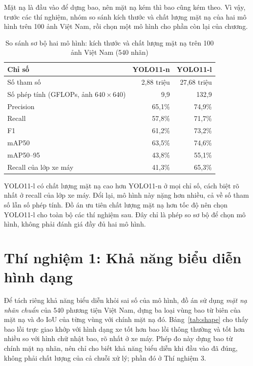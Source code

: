 Mặt nạ là đầu vào để dựng bao, nên mặt nạ kém thì bao cũng kém theo. Vì vậy, trước các thí nghiệm, nhóm so sánh kích thước và chất lượng mặt nạ của hai mô hình trên 100 ảnh Việt Nam, rồi chọn một mô hình cho phần còn lại của chương.

\begin{table}[H]
\centering
\caption{So sánh sơ bộ hai mô hình: kích thước và chất lượng mặt nạ trên 100 ảnh Việt Nam (540 nhãn)}
\label{tab:model_select}
\begin{tabular}{lrr}
\toprule
Chỉ số & YOLO11-n & YOLO11-l \\
\midrule
Số tham số & 2,88 triệu & 27,68 triệu \\
Số phép tính (GFLOPs, ảnh $640\times640$) & 9,9 & 132,9 \\
\midrule
Precision & 65,1\% & 74,9\% \\
Recall & 57,8\% & 71,7\% \\
F1 & 61,2\% & 73,2\% \\
mAP50 & 63,5\% & 74,6\% \\
mAP50--95 & 43,8\% & 55,1\% \\
Recall của lớp xe máy & 41,3\% & 65,3\% \\
\bottomrule
\end{tabular}
\end{table}

YOLO11-l có chất lượng mặt nạ cao hơn YOLO11-n ở mọi chỉ số, cách biệt rõ nhất ở recall của lớp xe máy. Đổi lại, mô hình này nặng hơn nhiều, cả về số tham số lẫn số phép tính.
Đồ án ưu tiên chất lượng mặt nạ hơn tốc độ nên chọn YOLO11-l cho toàn bộ các thí nghiệm sau. Đây chỉ là phép so sơ bộ để chọn mô hình, không phải đánh giá đầy đủ hai mô hình.

\section{Thí nghiệm 1: Khả năng biểu diễn hình dạng}
\label{sec:exp_shape}

Để tách riêng khả năng biểu diễn khỏi sai số của mô hình, đồ án sử dụng \emph{mặt nạ nhãn chuẩn} của 540 phương tiện Việt Nam,
dựng ba loại vùng bao từ biên của mặt nạ và đo IoU của từng vùng với chính mặt nạ đó.
Bảng~\ref{tab:shape} cho thấy bao lồi trực giao khớp với hình dạng xe tốt hơn bao lồi thông thường và tốt hơn nhiều so với hình chữ nhật bao, rõ nhất ở xe máy. Phép đo này dựng bao từ chính mặt nạ nhãn, nên chỉ cho biết khả năng biểu diễn khi đầu vào đã đúng,
không phải chất lượng của cả chuỗi xử lý; phần đó ở Thí nghiệm 3.

